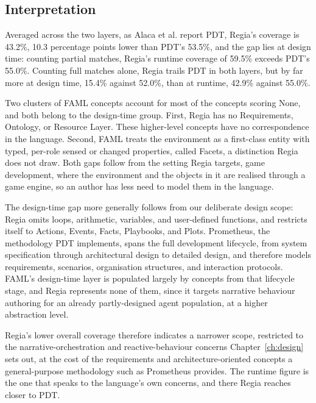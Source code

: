 \subsection{Interpretation}
\label{sec:faml-comparison-interpretation}
 
Averaged across the two layers, as Alaca et al. report PDT, Regia's coverage is 43.2\%, 10.3 percentage points lower than PDT's 53.5\%, and the gap lies at design time: counting partial matches, Regia's runtime coverage of 59.5\% exceeds PDT's 55.0\%. Counting full matches alone, Regia trails PDT in both layers, but by far more at design time, 15.4\% against 52.0\%, than at runtime, 42.9\% against 55.0\%.
 
Two clusters of FAML concepts account for most of the concepts scoring None, and both belong to the design-time group. First, Regia has no Requirements, Ontology, or Resource Layer. These higher-level concepts have no correspondence in the language. Second, FAML treats the environment as a first-class entity with typed, per-role sensed or changed properties, called Facets, a distinction Regia does not draw. Both gaps follow from the setting Regia targets, game development, where the environment and the objects in it are realised through a game engine, so an author has less need to model them in the language. 
 
The design-time gap more generally follows from our deliberate design scope: Regia omits loops, arithmetic, variables, and user-defined functions, and restricts itself to Actions, Events, Facts, Playbooks, and Plots. Prometheus, the methodology PDT implements, spans the full development lifecycle, from system specification through architectural design to detailed design, and therefore models requirements, scenarios, organisation structures, and interaction protocols. FAML's design-time layer is populated largely by concepts from that lifecycle stage, and Regia represents none of them, since it targets narrative behaviour authoring for an already partly-designed agent population, at a higher abstraction level.

Regia's lower overall coverage therefore indicates a narrower scope, restricted to the narrative-orchestration and reactive-behaviour concerns Chapter~\ref{ch:design} sets out, at the cost of the requirements and architecture-oriented concepts a general-purpose methodology such as Prometheus provides. The runtime figure is the one that speaks to the language's own concerns, and there Regia reaches closer to PDT.

